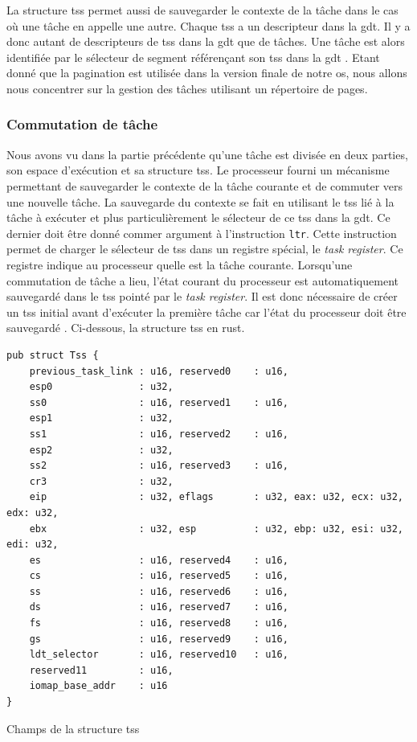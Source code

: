 La structure \acrshort{tss} permet aussi de sauvegarder le contexte de la tâche
dans le cas où une tâche en appelle une autre. Chaque \acrshort{tss} a un descripteur
dans la \acrshort{gdt}. Il y a donc autant de descripteurs de \acrshort{tss} dans
la \acrshort{gdt} que de tâches. Une tâche est alors identifiée par le sélecteur
de segment référençant son \acrshort{tss} dans la \acrshort{gdt} \cite{ref42}. Etant
donné que la pagination est utilisée dans la version finale de notre \acrshort{os},
nous allons nous concentrer sur la gestion des tâches utilisant un répertoire de
pages.


\subsubsection{Commutation de tâche}
Nous avons vu dans la partie précédente qu'une tâche est divisée en deux parties,
son espace d'exécution et sa structure \acrshort{tss}. Le processeur fourni un
mécanisme permettant de sauvegarder le contexte de la tâche courante et de commuter
vers une nouvelle tâche. La sauvegarde du contexte se fait en utilisant le \acrshort{tss}
lié à la tâche à exécuter et plus particulièrement le sélecteur de ce \acrshort{tss}
dans la \acrshort{gdt}. Ce dernier doit être donné commer argument à l'instruction
\texttt{ltr}. Cette instruction permet de charger le sélecteur de \acrshort{tss}
dans un registre spécial, le \textit{task register}. Ce registre indique au processeur
quelle est la tâche courante. Lorsqu'une commutation de tâche a lieu, l'état
courant du processeur est automatiquement sauvegardé dans le \acrshort{tss} pointé
par le \textit{task register}. Il est donc nécessaire de créer un \acrshort{tss}
initial avant d'exécuter la première tâche car l'état du processeur doit être
sauvegardé \cite{ref42}. Ci-dessous, la structure \acrshort{tss} en rust.

\begin{code}
\begin{verbatim}
pub struct Tss {
    previous_task_link : u16, reserved0    : u16,
    esp0               : u32,
    ss0                : u16, reserved1    : u16,
    esp1               : u32,
    ss1                : u16, reserved2    : u16,
    esp2               : u32,
    ss2                : u16, reserved3    : u16,
    cr3                : u32,
    eip                : u32, eflags       : u32, eax: u32, ecx: u32, edx: u32,
    ebx                : u32, esp          : u32, ebp: u32, esi: u32, edi: u32,
    es                 : u16, reserved4    : u16,
    cs                 : u16, reserved5    : u16,
    ss                 : u16, reserved6    : u16,
    ds                 : u16, reserved7    : u16,
    fs                 : u16, reserved8    : u16,
    gs                 : u16, reserved9    : u16,
    ldt_selector       : u16, reserved10   : u16,
    reserved11         : u16,
    iomap_base_addr    : u16
}
\end{verbatim}
\caption{Champs de la structure \acrshort{tss}}
\label{lst:tasks:tss}
\end{code} \bigbreak

